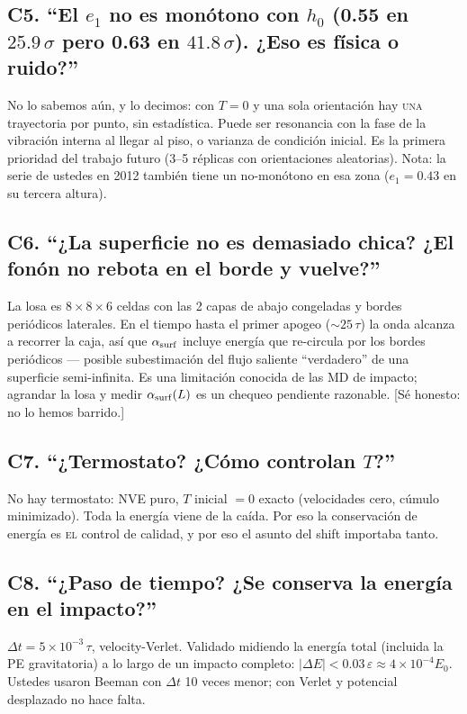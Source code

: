 \documentclass[11pt,a4paper]{article}
\newcommand{\eps}{\varepsilon}
\begin{document}
\subsection*{C5. ``El $e_1$ no es monótono con $h_0$ (0.55 en
$25.9\,\sigma$ pero 0.63 en $41.8\,\sigma$). ¿Eso es física o ruido?''}
\begin{respuesta}
No lo sabemos aún, y lo decimos: con $T=0$ y una sola orientación hay
\textsc{una} trayectoria por punto, sin estadística. Puede ser resonancia
con la fase de la vibración interna al llegar al piso, o varianza de
condición inicial. Es la primera prioridad del trabajo futuro (3--5
réplicas con orientaciones aleatorias). Nota: la serie de ustedes en 2012
también tiene un no-monótono en esa zona ($e_1=0.43$ en su tercera
altura).
\end{respuesta}

\subsection*{C6. ``¿La superficie no es demasiado chica? ¿El fonón no
rebota en el borde y vuelve?''}
\begin{respuesta}
La losa es $8\times8\times6$ celdas con las 2 capas de abajo congeladas y
bordes periódicos laterales. En el tiempo hasta el primer apogeo
($\sim25\,\tau$) la onda alcanza a recorrer la caja, así que
$\alpha_{\rm surf}$ incluye energía que re-circula por los bordes
periódicos --- posible subestimación del flujo saliente ``verdadero'' de
una superficie semi-infinita. Es una limitación conocida de las MD de
impacto; agrandar la losa y medir $\alpha_{\rm surf}(L)$ es un chequeo
pendiente razonable. [Sé honesto: no lo hemos barrido.]
\end{respuesta}

\subsection*{C7. ``¿Termostato? ¿Cómo controlan $T$?''}
\begin{respuesta}
No hay termostato: NVE puro, $T$ inicial $=0$ exacto (velocidades cero,
cúmulo minimizado). Toda la energía viene de la caída. Por eso la
conservación de energía es \textsc{el} control de calidad, y por eso el
asunto del shift importaba tanto.
\end{respuesta}

\subsection*{C8. ``¿Paso de tiempo? ¿Se conserva la energía en el
impacto?''}
\begin{respuesta}
$\Delta t=5\times10^{-3}\,\tau$, velocity-Verlet. Validado midiendo la
energía total (incluida la PE gravitatoria) a lo largo de un impacto
completo: $|\Delta E|<0.03\,\eps\approx4\times10^{-4}E_0$. Ustedes usaron
Beeman con $\Delta t$ 10 veces menor; con Verlet y potencial desplazado
no hace falta.
\end{respuesta}
\end{document}
